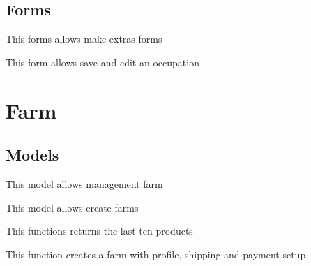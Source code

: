 \documentclass[letterpaper,10pt,english]{sphinxmanual}
\begin{document}
\subsection{Forms}
\label{modules/extras:forms}
This forms allows make extras forms
\label{modules/extras:module-apps.extras.forms}

\begin{fulllineitems}
\label{modules/extras:apps.extras.forms.OccupationForm}
This form allows save and edit an occupation

\end{fulllineitems}



\section{Farm}
\label{modules/farm:farm}\label{modules/farm::doc}

\subsection{Models}
\label{modules/farm:models}
This model allows management farm
\label{modules/farm:module-apps.farm.models}

\begin{fulllineitems}
\label{modules/farm:apps.farm.models.Farm}
This model allows create farms

\begin{fulllineitems}
\label{modules/farm:apps.farm.models.Farm.get_last_products}
This functions returns the last ten products

\end{fulllineitems}


\begin{fulllineitems}
\label{modules/farm:apps.farm.models.Farm.save}
This function creates a farm with profile, shipping and payment setup

\end{fulllineitems}


\end{fulllineitems}
\end{document}
